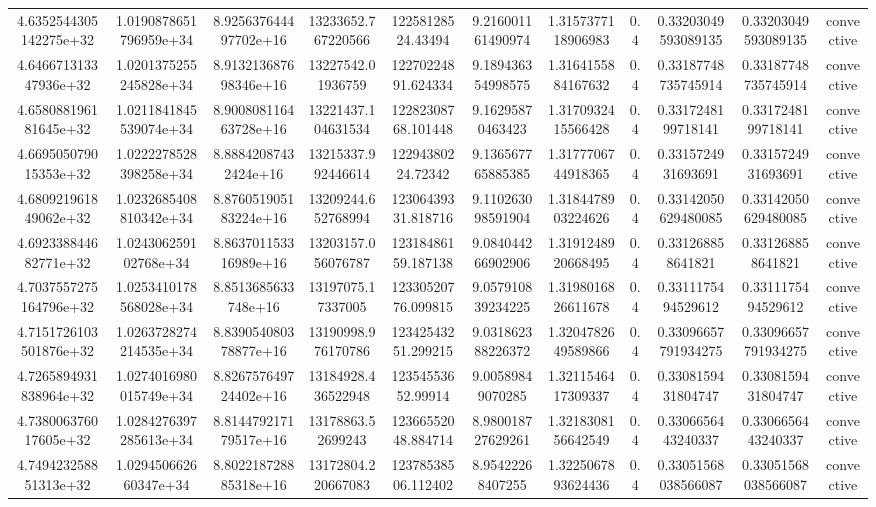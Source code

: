\begin{table}
\begin{tabular}{ccccccccccc}
4.6352544305142275e+32 & 1.0190878651796959e+34 & 8.925637644497702e+16 & 13233652.767220566 & 12258128524.43494 & 9.216001161490974 & 1.3157377118906983 & 0.4 & 0.33203049593089135 & 0.33203049593089135 & convective \\
4.646671313347936e+32 & 1.0201375255245828e+34 & 8.913213687698346e+16 & 13227542.01936759 & 12270224891.624334 & 9.189436354998575 & 1.3164155884167632 & 0.4 & 0.33187748735745914 & 0.33187748735745914 & convective \\
4.658088196181645e+32 & 1.0211841845539074e+34 & 8.900808116463728e+16 & 13221437.104631534 & 12282308768.101448 & 9.16295870463423 & 1.3170932415566428 & 0.4 & 0.3317248199718141 & 0.3317248199718141 & convective \\
4.669505079015353e+32 & 1.0222278528398258e+34 & 8.88842087432424e+16 & 13215337.992446614 & 12294380224.72342 & 9.136567765885385 & 1.3177706744918365 & 0.4 & 0.3315724931693691 & 0.3315724931693691 & convective \\
4.680921961849062e+32 & 1.0232685408810342e+34 & 8.876051905183224e+16 & 13209244.652768994 & 12306439331.818716 & 9.110263098591904 & 1.3184478903224626 & 0.4 & 0.33142050629480085 & 0.33142050629480085 & convective \\
4.692338844682771e+32 & 1.024306259102768e+34 & 8.863701153316989e+16 & 13203157.056076787 & 12318486159.187138 & 9.084044266902906 & 1.3191248920668495 & 0.4 & 0.331268858641821 & 0.331268858641821 & convective \\
4.7037557275164796e+32 & 1.0253410178568028e+34 & 8.8513685633748e+16 & 13197075.17337005 & 12330520776.099815 & 9.057910839234225 & 1.3198016826611678 & 0.4 & 0.3311175494529612 & 0.3311175494529612 & convective \\
4.7151726103501876e+32 & 1.0263728274214535e+34 & 8.839054080378877e+16 & 13190998.976170786 & 12342543251.299215 & 9.031862388226372 & 1.3204782649589866 & 0.4 & 0.33096657791934275 & 0.33096657791934275 & convective \\
4.7265894931838964e+32 & 1.0274016980015749e+34 & 8.826757649724402e+16 & 13184928.436522948 & 12354553652.99914 & 9.00589849070285 & 1.3211546417309337 & 0.4 & 0.3308159431804747 & 0.3308159431804747 & convective \\
4.738006376017605e+32 & 1.0284276397285613e+34 & 8.814479217179517e+16 & 13178863.52699243 & 12366552048.884714 & 8.980018727629261 & 1.3218308156642549 & 0.4 & 0.3306656443240337 & 0.3306656443240337 & convective \\
4.749423258851313e+32 & 1.029450662660347e+34 & 8.802218728885318e+16 & 13172804.220667083 & 12378538506.112402 & 8.95422268407255 & 1.3225067893624436 & 0.4 & 0.33051568038566087 & 0.33051568038566087 & convective \\

\end{tabular}
\end{table}
